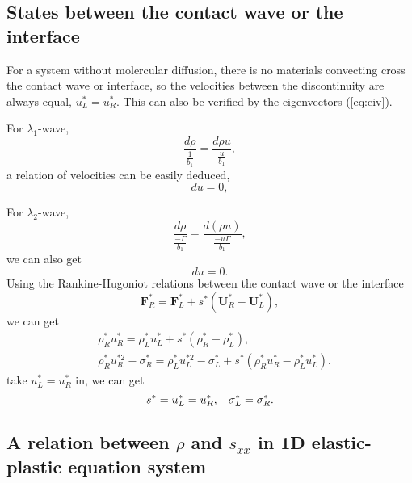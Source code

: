 \documentclass{article}
\theoremstyle{plain}\newtheorem{definition}{\sc{Definition}}
\theoremstyle{defination}\newtheorem{example}{Example}[section]
\numberwithin{equation}{section}
\numberwithin{table}{section}
\begin{document}
  \subsection{States between the  contact wave or the interface}
  For  a  system without molercular diffusion, there is no materials convecting  cross the contact wave or interface, so the velocities between the discontinuity are always equal, $u_L^* = u_R^*$. This can also be verified by the eigenvectors (\ref{eq:eiv}).

  For $\lambda_1$-wave, 
  \begin{equation}
	\frac{d\rho}{\frac{1}{b_1}} = \frac{d\rho u}{\frac{u}{b_1}},
  \end{equation}
  a relation of velocities can be easily deduced,
  \begin{equation}
	du =0,
  \end{equation}

 For $\lambda_2$-wave,
 \begin{equation}
   \frac{d\rho}{\frac{-\Gamma}{b_1}} = \frac{d(\rho u)}{\frac{-u\Gamma}{b_1}},
\end{equation}
we can  also get  
  \begin{equation}
	du =0.
  \end{equation}
Using  the Rankine-Hugoniot relations between the contact wave  or  the interface
\begin{equation}
	\bm{F}_R^* = \bm{F}_L^*+s^*(\bm{U}_R^*-\bm{U}_L^*),
\end{equation}
we can get 
\begin{align}
  &\rho_R^* u_R^*=\rho_L^* u_L^*+s^*(\rho_R^*-\rho_L^*),\\
  &\rho_R^* u_R^{*2}-\sigma^*_R=\rho_L^* u_L^{*2}-\sigma_L^*+s^*(\rho_R^* u_R^*-\rho_L^* u_L^*).
\end{align}
take $u_L^* = u_R^*$ in, we can get 
\begin{equation}\label{eq:contact}
  s^* = u_L^* = u_R^*, \hspace{0.3cm} \sigma_L^* = \sigma_R^*.
\end{equation}

\subsection{A relation between $\rho$ and $s_{xx}$ in 1D elastic-plastic  equation system}
 
\end{document}
